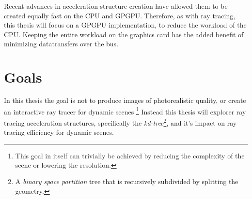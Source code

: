 Recent advances in acceleration structure creation have allowed them
to be created equally fast on the CPU and
GPGPU. Therefore, as with ray tracing, this thesis
will focus on a GPGPU implementation, to reduce the workload of the
CPU. Keeping the entire workload on the graphics card has the added
benefit of minimizing datatransfers over the bus.









\section{Goals}

In this thesis the goal is not to produce images of photorealistic
quality, or create an interactive ray tracer for dynamic
scenes \footnote{This goal in itself can trivially be achieved by
  reducing the complexity of the scene or lowering the resolution.}
Instead this thesis will explorer ray tracing acceleration structures,
specifically the \textit{kd-tree}\footnote{A \textit{binary space
    partition} tree that is recursively subdivided by splitting the
  geometry.}, and it's impact on ray tracing efficiency for dynamic
scenes. 

